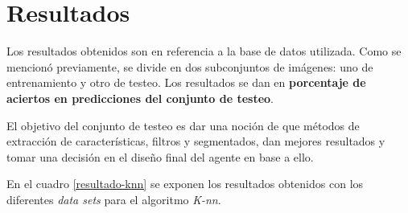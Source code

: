 \documentclass[10pt,a4paper]{article}
\begin{document}
\section{Resultados\label{resultados}}
Los resultados obtenidos son en referencia a la base de datos utilizada. Como se mencionó previamente, se divide en dos subconjuntos de imágenes: uno de entrenamiento y otro de testeo. Los resultados se dan en \textbf{porcentaje de aciertos en predicciones del conjunto de testeo}.

El objetivo del conjunto de testeo es dar una noción de que métodos de extracción de características, filtros y segmentados, dan mejores resultados y tomar una decisión en el diseño final del agente en base a ello. 

En el cuadro \ref{resultado-knn} se exponen los resultados obtenidos con los diferentes \textit{data sets} para el algoritmo \textit{K-nn}.
\end{document}
